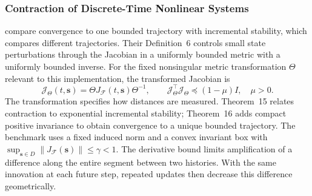 \subsubsection{Contraction of Discrete-Time Nonlinear Systems}

\citet{tran2019convergence} compare convergence to one bounded trajectory
with incremental stability, which compares different trajectories.
Their Definition~6 controls small state perturbations through the Jacobian
in a uniformly bounded metric with a uniformly bounded inverse.
For the fixed nonsingular metric transformation $\Theta$ relevant to this
implementation, the transformed Jacobian is
\begin{equation}
 \mathcal J_\Theta(t,\mathbf{s})
 =\Theta J_{\mathcal F}(t,\mathbf{s})\Theta^{-1},
 \qquad
 \mathcal J_\Theta^\top\mathcal J_\Theta\preceq(1-\mu)I,
 \quad \mu>0.
\end{equation}
The transformation specifies how distances are measured. Theorem~15
relates contraction to exponential incremental stability; Theorem~16
adds compact positive invariance to obtain convergence to a unique bounded
trajectory. The benchmark uses a fixed induced norm and a convex invariant
box with $\sup_{\mathbf{s}\in D}\|J_{\mathcal F}(\mathbf{s})\|\leq\gamma<1$.
The derivative bound limits amplification of a difference along the entire
segment between two histories. With the same innovation at each future
step, repeated updates then decrease this difference geometrically.
